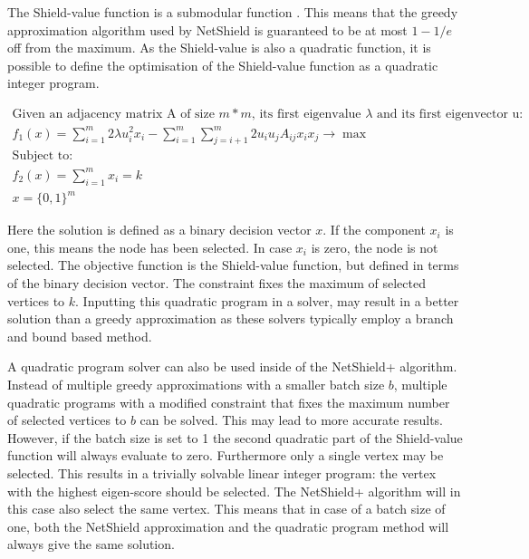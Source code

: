 \documentclass[11pt]{article}
\theoremstyle{definition}
\begin{document}
The Shield-value function is a submodular function \cite{chen2016node}. This means that the greedy approximation algorithm used by NetShield is guaranteed to be at most $1-1/e$ off from the maximum. As the Shield-value is also a quadratic function, it is possible to define the optimisation of the Shield-value function as a quadratic integer program.

\begin{equation}
\begin{gathered}
\text{Given an adjacency matrix A of size $m*m$, its first eigenvalue $\lambda$ and its first eigenvector u:}\\
f_{1}(x) = \sum_{i=1}^{m} 2 \lambda  u_{i}^{2} x_{i} - \sum_{i=1}^{m} \sum_{j=i+1}^{m} 2 u_{i} u_{j} A_{ij} x_{i} x_{j} \to \max \\
\text{Subject to:}\\
f_{2}(x) = \sum_{i=1}^{m} x_{i} = k\\
x = \{0,1\}^{m}
\end{gathered}
\end{equation}

Here the solution is defined as a binary decision vector $x$. If the component $x_{i}$ is one, this means the node has been selected. In case $x_{i}$ is zero, the node is not selected. The objective function is the Shield-value function, but defined in terms of the binary decision vector. The constraint fixes the maximum of selected vertices to $k$. Inputting this quadratic program in a solver, may result in a better solution than a greedy approximation as these solvers typically employ a branch and bound based method.

A quadratic program solver can also be used inside of the NetShield+ algorithm. Instead of multiple greedy approximations with a smaller batch size $b$, multiple quadratic programs with a modified constraint that fixes the maximum number of selected vertices to $b$ can be solved. This may lead to more accurate results. However, if the batch size is set to 1 the second quadratic part of the Shield-value function will always evaluate to zero. Furthermore only a single vertex may be selected. This results in a trivially solvable linear integer program: the vertex with the highest eigen-score should be selected. The NetShield+ algorithm will in this case also select the same vertex. This means that in case of a batch size of one, both the NetShield approximation and the quadratic program method will always give the same solution.
\end{document}

